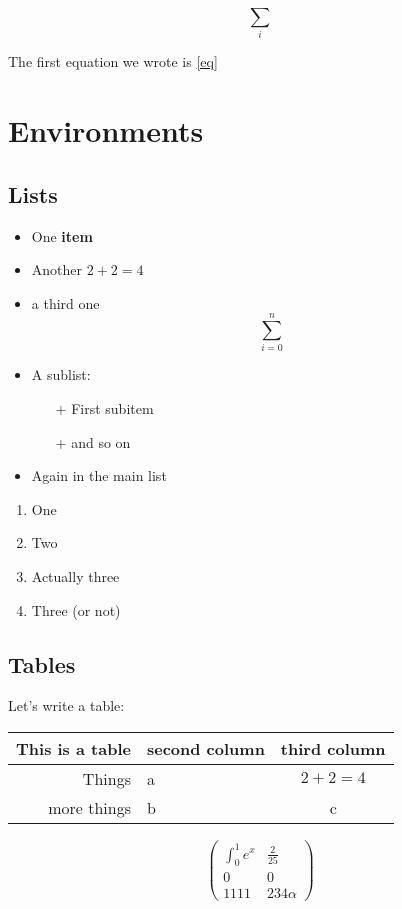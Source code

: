 \documentclass[10pt,a4paper]{article}
\theoremstyle{definition}
\theoremstyle{remark}
\begin{document}
\[ \sum_i \]

The first equation we wrote is \eqref{eq}

\section{Environments}

\subsection{Lists}
\label{subsectionLists}

\begin{itemize}
	\item One \textbf{item}
	\item Another \(2+2=4\)
	\item a third one \[\sum_{i=0}^n\]
	\item A sublist:
		\begin{itemize}
			\item[+] First subitem
			\item[+] and so on
		\end{itemize}
	\item Again in the main list
\end{itemize}

\begin{enumerate}[label=\Roman*]
	\item One
	\item Two
	\item Actually three
	\item Three (or not)
\end{enumerate}

\subsection*{Tables}

Let's write a table:

\vspace{1cm}
\begin{tabular}{r||l|c}
\hline
This is a table & second column & third column \\
\hline
Things          & a             & \( 2+2 = 4 \)\\
\hline
more things     & b             & c
\end{tabular}

\vspace{1cm}
\[
	\left(\begin{array}{cc}
		\int_0^1 e^x  &  \frac{2}{25} \\
		0 & 0 \\
		1111 & 234\alpha
	\end{array}\right)
\]
\end{document}
